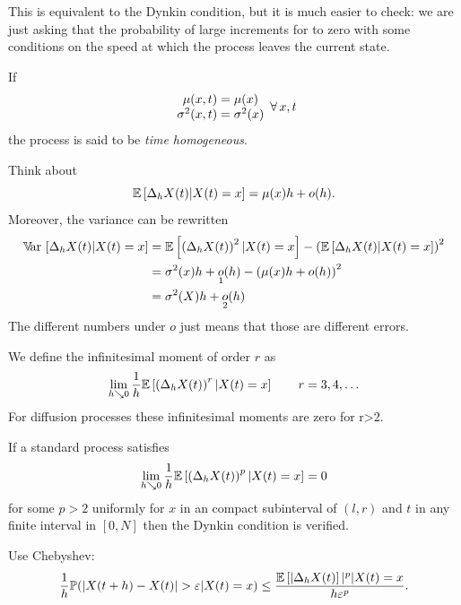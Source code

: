 \documentclass[12pt]{report}
\begin{document}
This is equivalent to the Dynkin condition, but it is much easier to check: we are just asking that the probability of large increments for to zero with some conditions on the speed at which the process leaves the current state.
\begin{definition}
	If
	\begin{equation*}
		\begin{array}{c}
			\mu(x,t)=\mu(x)\\
			\sigma^{2}(x,t)=\sigma^{2}(x)
		\end{array}\forall\, x,t
	\end{equation*}
	the process is said to be \emph{time homogeneous}.
\end{definition}
\begin{remark}
	Think about
	\begin{equation*}
		\mathbb{E}\left[\Delta_{h}X(t)|X(t)=x\right]=\mu(x)h+o(h).
	\end{equation*}
	Moreover, the variance can be rewritten
	\begin{align*}
		\mathbb{V}\!\mathrm{ar}\,\left[\Delta_{h} X(t)|X(t)=x\right]&=\mathbb{E}\left[\left(\Delta_{h}X(t)\right)^{2}|X(t)=x\right]-\left(\mathbb{E}\left[\Delta_{h}X(t)|X(t)=x\right]\right)^{2}\\
		&=\sigma^{2}(x)h+\underset{1}{o}(h)-\left(\mu(x)h+o(h)\right)^{2}\\
		&=\sigma^{2}(X)h+\underset{2}{o}(h)
	\end{align*}
	The different numbers under $o$ just means that those are different errors.
\end{remark}
\begin{definition}
	We define the infinitesimal moment of order $r$ as
	\begin{equation*}
		\lim_{h\searrow0}\frac{1}{h}\mathbb{E}\left[\left(\Delta_{h}X(t)\right)^{r}|X(t)=x\right]\qquad r=3,4,\ldots
	\end{equation*}
	For diffusion processes these infinitesimal moments are zero for r>2.
\end{definition}
\begin{lemma}
	If a standard process satisfies
	\begin{equation*}
		\lim_{h\searrow0}\frac{1}{h}\mathbb{E}\left[\left(\Delta_{h}X(t)\right)^{p}|X(t)=x\right]=0
	\end{equation*}
	for some $p>2$ uniformly for $x$ in an compact subinterval of $(l,r)$ and $t$ in any finite interval in $[0,N]$ then the Dynkin condition is verified.
\end{lemma}
\begin{fancyproof}
	Use Chebyshev:
	\begin{equation*}
		\frac{1}{h}\pr(|X(t+h)-X(t)|>\varepsilon|X(t)=x)\leq\frac{\ev{|\Delta_{h}X(t)}|^{p}|X(t)=x}{h\varepsilon^{p}}.
	\end{equation*}
\end{fancyproof}
\end{document}
